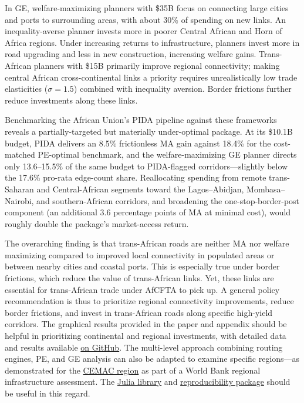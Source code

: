 \documentclass[a4paper]{article}
\begin{document}
In GE, welfare-maximizing planners with \$35B focus on connecting large cities and ports to surrounding areas, with about 30\% of spending on new links. An inequality-averse planner invests more in poorer Central African and Horn of Africa regions. Under increasing returns to infrastructure, planners invest more in road upgrading and less in new construction, increasing welfare gains. Trans-African planners with \$15B primarily improve regional connectivity; making central African cross-continental links a priority requires unrealistically low trade elasticities ($\sigma = 1.5$) combined with inequality aversion. Border frictions further reduce investments along these links. \newline

Benchmarking the African Union's PIDA pipeline against these frameworks reveals a partially-targeted but materially under-optimal package. At its \$10.1B budget, PIDA delivers an 8.5\% frictionless MA gain against 18.4\% for the cost-matched PE-optimal benchmark, and the welfare-maximizing GE planner directs only 13.6--15.5\% of the same budget to PIDA-flagged corridors---slightly below the 17.6\% pro-rata edge-count share. Reallocating spending from remote trans-Saharan and Central-African segments toward the Lagos--Abidjan, Mombasa--Nairobi, and southern-African corridors, and broadening the one-stop-border-post component (an additional 3.6 percentage points of MA at minimal cost), would roughly double the package's market-access return. \newline

The overarching finding is that trans-African roads are neither MA nor welfare maximizing compared to improved local connectivity in populated areas or between nearby cities and coastal ports. This is especially true under border frictions, which reduce the value of trans-African links. Yet, these links are essential for trans-African trade under AfCFTA to pick up. A general policy recommendation is thus to prioritize regional connectivity improvements, reduce border frictions, and invest in trans-African roads along specific high-yield corridors. The graphical results provided in the paper and appendix should be helpful in prioritizing continental and regional investments, with detailed data and results available \href{https://github.com/SebKrantz/OptimalAfricanRoads}{on GitHub}. The multi-level approach combining routing engines, PE, and GE analysis can also be adapted to examine specific regions---as demonstrated for the \href{https://www.dropbox.com/scl/fi/67nwybv21px11r5bnqoek/optimal_CEMAC_roads.pdf?rlkey=x7q71wzfxjddtushojo4w4rec&e=1&dl=0}{CEMAC region} as part of a World Bank regional infrastructure assessment. The \href{https://github.com/OptimalTransportNetworks/OptimalTransportNetworks.jl}{Julia library} and \href{https://github.com/SebKrantz/OptimalAfricanRoads}{reproducibility package} should be useful in this regard.
\end{document}
